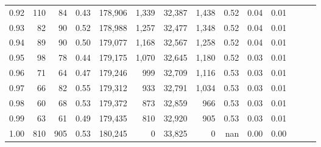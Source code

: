 \begin{tabular}{rrrrrrrrrrrrrr}
0.92 &    110 &   84 &  0.43 &  178,906 &    1,339 &  32,387 &   1,438 &  0.52 &  0.04 &      0.01 \\
0.93 &     82 &   90 &  0.52 &  178,988 &    1,257 &  32,477 &   1,348 &  0.52 &  0.04 &      0.01 \\
0.94 &     89 &   90 &  0.50 &  179,077 &    1,168 &  32,567 &   1,258 &  0.52 &  0.04 &      0.01 \\
0.95 &     98 &   78 &  0.44 &  179,175 &    1,070 &  32,645 &   1,180 &  0.52 &  0.03 &      0.01 \\
0.96 &     71 &   64 &  0.47 &  179,246 &      999 &  32,709 &   1,116 &  0.53 &  0.03 &      0.01 \\
0.97 &     66 &   82 &  0.55 &  179,312 &      933 &  32,791 &   1,034 &  0.53 &  0.03 &      0.01 \\
0.98 &     60 &   68 &  0.53 &  179,372 &      873 &  32,859 &     966 &  0.53 &  0.03 &      0.01 \\
0.99 &     63 &   61 &  0.49 &  179,435 &      810 &  32,920 &     905 &  0.53 &  0.03 &      0.01 \\
1.00 &    810 &  905 &  0.53 &  180,245 &        0 &  33,825 &       0 &   nan &  0.00 &      0.00 \\
\bottomrule
\end{tabular}
